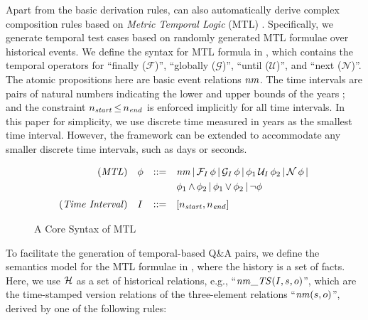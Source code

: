 Apart from the basic derivation rules, \tool can also automatically derive complex composition rules based on \emph{Metric Temporal Logic} (MTL) \cite{DBLP:conf/lics/OuaknineW05}. 
Specifically, we generate temporal test cases  based on randomly generated MTL formulae over historical events. 
We define the syntax for MTL formula in , which contains the temporal operators for ``finally ($\mathcal{F}$)'', 
``globally ($\mathcal{G}$)'', 
``until ($\mathcal{U}$)'', 
and ``next ($\mathcal{N}$)''. 
The atomic propositions here are basic event relations $\mathit{nm}$. 
The time intervals are pairs of natural numbers indicating the lower and upper bounds of the years%
; and the constraint $n_{\mathit{start}} \,{\leq}\, n_{\mathit{end}}$ is enforced implicitly for all time intervals. 
In this paper for simplicity, we use discrete time measured in years as the smallest time interval. However, the framework can be extended to accommodate any smaller discrete time intervals, such as days or seconds. 


\begin{figure}[!h] 
\vspace{-2.5mm}
\small
\centering
\begin{align*}
(\m{MTL})\quad & \mtl &{::=}\quad &
\nm %
\,{\mid}\, \mathcal{F}_\interval \,\mtl
\,{\mid}\, \mathcal{G}_\interval \,\mtl 
\,{\mid}\, \mtl_1  
\,\mathcal{U}_\interval \,  \mtl_2 
\,{\mid}\, \mathcal{N} \,\mtl
\,{\mid}\, 
\\
&&&
 \mtl_1  \,{\wedge}\, \mtl_2
\,{\mid}\, \mtl_1  \,{\vee}\, \mtl_2
\,{\mid}\, \neg \mtl 
\\[0.3em]
(\m{Time~Interval}) \quad& \interval &{::=}\quad & [\Istart, \Iend]
\end{align*}
\vspace{-4mm}
\caption{A Core Syntax of MTL}
\label{fig:syntax_of_the_metric_temporal_logic}
\vspace{-3mm}
\end{figure}


To facilitate the generation of temporal-based Q\&A pairs, we define the semantics model for the MTL formulae in , where the history is a set of facts. 
Here, we use $\mathcal{H}$ as a set of historical relations, 
e.g., ``$\mathit{nm}\_{\mathit{TS}}(I, s, o)$'', which are the time-stamped version relations of the three-element relations ``$\mathit{nm}(s, o)$'', derived by one of the following rules: \\[-0.5em]

